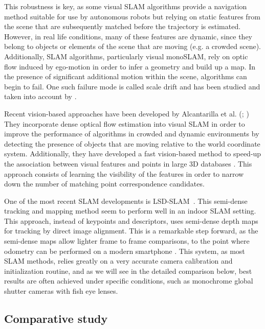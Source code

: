 This robustness is key, as some visual SLAM algorithms provide a navigation method suitable for use by autonomous robots \citep{konolige2007frame} but relying on static features from the scene that are subsequently matched before the trajectory is estimated. However, in real life conditions, many of these features are dynamic, since they belong to objects or elements of the scene that are moving (e.g. a crowded scene). Additionally, SLAM algorithms, particularly visual monoSLAM, rely on optic flow induced by ego-motion in order to infer a geometry and build up a map. In the presence of significant additional motion within the scene, algorithms can begin to fail.  One such failure mode is called scale drift and has been studied and taken into account by \cite{strasdat2010scale}. 

Recent vision-based approaches have been developed by Alcantarilla et al. (\citeyear{alcantarilla2010visual}; \citeyear{alcantarilla2012combining}) They incorporate dense optical flow estimation into visual SLAM in order to improve the performance of algorithms in crowded and dynamic environments by detecting the presence of objects that are moving relative to the world coordinate system. Additionally, they have developed a fast vision-based method to speed-up the association between visual features and points in large 3D databases \citep{alcantarilla2010learning}. This approach consists of learning the visibility of the features in order to narrow down the number of matching point correspondence candidates.

One of the most recent SLAM developments is LSD-SLAM~\citep{engel14eccv}. This semi-dense tracking and mapping method seem to perform well in an indoor SLAM setting. This approach, instead of keypoints and descriptors, uses semi-dense depth maps for tracking by direct image alignment. This is a remarkable step forward, as the semi-dense maps allow lighter frame to frame comparisons, to the point where odometry can be performed on a modern smartphone \citep{schoeps14ismar}. This system, as most SLAM methods, relies greatly on a very accurate camera calibration and initialization routine, and as we will see in the detailed comparison below, best results are often achieved under specific conditions, such as monochrome global shutter cameras with fish eye lenses.

\subsection{Comparative study}

